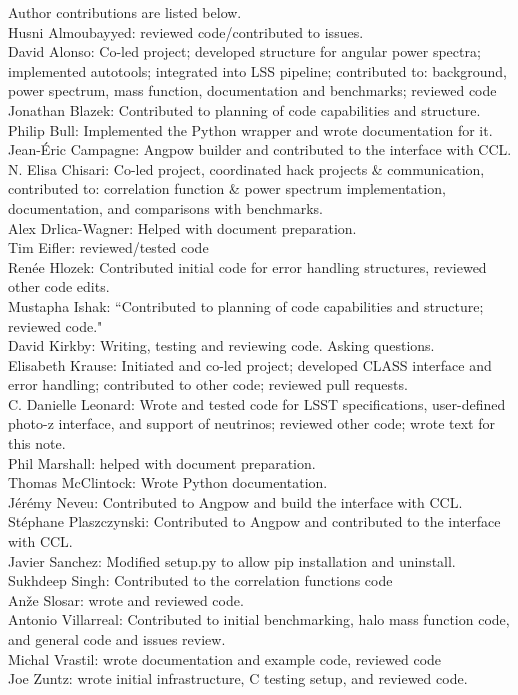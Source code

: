 Author contributions are listed below. \\
Husni Almoubayyed: reviewed code/contributed to issues. \\
David Alonso: Co-led project; developed structure for angular power spectra; implemented autotools; integrated into LSS pipeline; contributed to: background, power spectrum, mass function, documentation and benchmarks; reviewed code \\
Jonathan Blazek: Contributed to planning of code capabilities and structure. \\
Philip Bull: Implemented the Python wrapper and wrote documentation for it. \\
Jean-\'Eric Campagne: Angpow builder and contributed to the interface with CCL. \\
N. Elisa Chisari: Co-led project, coordinated hack projects \& communication, contributed to: correlation function \& power spectrum implementation, documentation, and comparisons with benchmarks. \\
Alex Drlica-Wagner: Helped with document preparation. \\
Tim Eifler: reviewed/tested code \\
Ren\'ee Hlozek: Contributed initial code for error handling structures, reviewed other code edits. \\
Mustapha Ishak: “Contributed to planning of code capabilities and structure; reviewed code." \\
David Kirkby: Writing, testing and reviewing code. Asking questions. \\
Elisabeth Krause: Initiated and co-led project; developed CLASS interface and error handling; contributed to other code; reviewed pull requests. \\
C. Danielle Leonard: Wrote and tested code for LSST specifications, user-defined photo-z interface, and support of neutrinos; reviewed other code; wrote text for this note. \\
Phil Marshall: helped with document preparation. \\
Thomas McClintock: Wrote Python documentation. \\
J\'er\'emy Neveu: Contributed to Angpow and build the interface with CCL. \\
St\'ephane Plaszczynski: Contributed to Angpow and contributed to the interface with CCL. \\
Javier Sanchez: Modified setup.py to allow pip installation and uninstall. \\
Sukhdeep Singh: Contributed to the correlation functions code \\
An\v{z}e Slosar: wrote and reviewed code. \\
Antonio Villarreal: Contributed to initial benchmarking, halo mass function code, and general code and issues review. \\
Michal Vrastil: wrote documentation and example code, reviewed code \\
Joe Zuntz: wrote initial infrastructure, C testing setup, and reviewed code. \\
